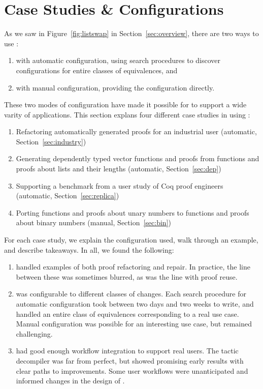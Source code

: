 \section{Case Studies \& Configurations}
\label{sec:search}

As we saw in Figure~\ref{fig:listswap} in Section~\ref{sec:overview},
there are two ways to use \toolname:

\begin{enumerate}
\item with automatic configuration, using search procedures to discover configurations for entire classes of equivalences, and
\item with manual configuration, providing the configuration directly.
\end{enumerate}
These two modes of configuration have made it possible for \toolname to support a wide
varity of applications.
This section explans four different case studies in using \toolname:

\begin{enumerate}
\item Refactoring automatically generated proofs for an industrial user (automatic, Section~\ref{sec:industry})
\item Generating dependently typed vector functions and proofs from functions and proofs about lists and their lengths (automatic, Section~\ref{sec:dep})
\item Supporting a benchmark from a user study of Coq proof engineers (automatic, Section~\ref{sec:replica})
\item Porting functions and proofs about unary numbers to functions and proofs about binary numbers (manual, Section~\ref{sec:bin})
\end{enumerate}
For each case study, we explain the configuration used, walk through an example, and describe takeaways.
In all, we found the following:

\begin{enumerate}
\item \toolname handled examples of both proof refactoring and repair. In practice, the line between these was sometimes
blurred, as was the line with proof reuse.
\item \toolname was configurable to different classes of changes. Each search procedure for automatic configuration
took between two days and two weeks to write, and handled an entire class of equivalences corresponding to a real use case.
Manual configuration was possible for an interesting use case, but remained challenging.
\item \toolname had good enough workflow integration to support real users.
The tactic decompiler was far from perfect, but showed promising early results with clear paths to improvements.
Some user workflows were unanticipated and informed changes in the design of \toolname.
\end{enumerate}

